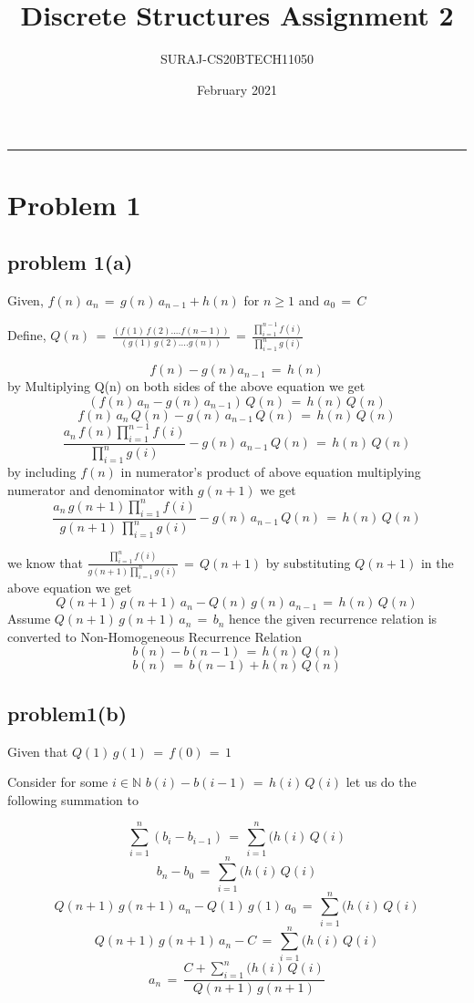 \documentclass{article}
\title{\textbf{Discrete Structures Assignment 2}}
\author{SURAJ-CS20BTECH11050}
\date{February 2021}
\begin{document}
\maketitle
\hrule
\section*{Problem 1}
\subsection*{problem 1(a)}
Given, $f(n)\,a_{n}\,=\,g(n)\,a_{n-1}+h(n)$ for $n\geq 1$ and $a_{0}\,=\,C$
\null \par
\noindent Define, $Q(n)\,=\,\frac{(f(1)\,f(2)....f(n-1))} 
{(g(1)\,g(2)....g(n))}\,=\,\frac{\displaystyle\prod_{i=1}^{n-1}f(i)}
{\displaystyle\prod_{i=1}^{n}g(i)}$
\null \par \null
           $$f(n)-g(n)a_{n-1}\,=\,h(n)$$
by Multiplying  Q(n) on both sides of the above equation we get 
        $$ (f(n)\,a_{n}-g(n)\,a_{n-1})\,Q(n)\,=\,h(n)\,Q(n)$$
        $$f(n)\,a_{n}\,Q(n)-g(n)\,a_{n-1}\,Q(n)\,=\,h(n)\,Q(n)$$
        $$\frac{a_{n}\,f(n)\displaystyle\prod_{i=1}^{n-1}f(i)}
{\displaystyle\prod_{i=1}^{n}g(i)}-g(n)\,a_{n-1}\,Q(n)\,=\,h(n)\,Q(n)$$
by including $f(n)$ in numerator's product of above equation multiplying
numerator and denominator with $g(n+1)$ we get
$$\frac{a_{n}\,g(n+1)\displaystyle\prod_{i=1}^{n}f(i)}
{g(n+1)\,\displaystyle\prod_{i=1}^{n}g(i)}-g(n)\,a_{n-1}\,Q(n)\,=\,h(n)\,Q(n)$$

\newpage
\noindent we know that $\frac{\displaystyle\prod_{i=1}^{n}f(i)}
{g(n+1)\displaystyle\prod_{i=1}^{n}g(i)}\,=\,Q(n+1)$ by substituting
$Q(n+1)$ in the above equation we get
         $$Q(n+1)\,g(n+1)\,a_{n}-Q(n)\,g(n)\,a_{n-1}\,=\,h(n)\,Q(n)$$
Assume $Q(n+1)\,g(n+1)\,a_{n}\,=\,b_n$ hence the given recurrence relation is
converted to Non-Homogeneous Recurrence Relation
$$b(n)-b(n-1)\,=\,h(n)\,Q(n)$$
$$b(n)\,=\,b(n-1)+h(n)\,Q(n)$$

\subsection*{problem1(b)}
\noindent Given that $Q(1)\,g(1)\,=\,f(0)\,=\,1$ 
\null \par \null
\noindent Consider for some $i \in \mathbb{N}$ $b(i)-b(i-1)\,=\,h(i)\,Q(i)$
let us do the following summation to 

     \[\sum_{i=1}^{n}(b_{i}-b_{i-1})\,=\,\sum_{i=1}^{n}(h(i)\,Q(i) \]
     \[b_{n}-b_{0}\,=\,\sum_{i=1}^{n}(h(i)\,Q(i) \]
     \[Q(n+1)\,g(n+1)\,a_{n}-Q(1)\,g(1)\,a_{0}\,=\,\sum_{i=1}^{n}(h(i)\,Q(i) \]
\[Q(n+1)\,g(n+1)\,a_{n}-C\,=\,\sum_{i=1}^{n}(h(i)\,Q(i) \]
\[a_{n}\,=\,\frac{C+\displaystyle\sum_{i=1}^{n}(h(i)\,Q(i)}{Q(n+1)\,g(n+1)} \]
\end{document}

